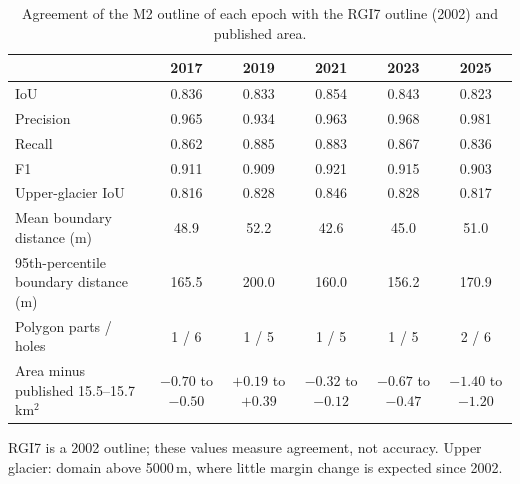 \documentclass[10pt]{article}
\newcommand{\kmsq}{km$^2$}
\begin{document}
\begin{table}[p]
\centering\footnotesize
\setlength{\tabcolsep}{5pt}
\begin{threeparttable}
\caption{Agreement of the M2 outline of each epoch with the RGI7 outline (2002) and published area.}
\label{tab:epoch_agreement}
\begin{tabular}{l ccccc}
\toprule
 & \textbf{2017} & \textbf{2019} & \textbf{2021} & \textbf{2023} & \textbf{2025} \\
\midrule
IoU                                  & 0.836 & 0.833 & 0.854 & 0.843 & 0.823 \\
Precision                            & 0.965 & 0.934 & 0.963 & 0.968 & 0.981 \\
Recall                               & 0.862 & 0.885 & 0.883 & 0.867 & 0.836 \\
F1                                   & 0.911 & 0.909 & 0.921 & 0.915 & 0.903 \\
Upper-glacier IoU                    & 0.816 & 0.828 & 0.846 & 0.828 & 0.817 \\
Mean boundary distance (m)           & 48.9 & 52.2 & 42.6 & 45.0 & 51.0 \\
95th-percentile boundary distance (m) & 165.5 & 200.0 & 160.0 & 156.2 & 170.9 \\
Polygon parts / holes                & 1 / 6 & 1 / 5 & 1 / 5 & 1 / 5 & 2 / 6 \\
Area minus published 15.5--15.7\,\kmsq & $-0.70$ to $-0.50$ & $+0.19$ to $+0.39$ & $-0.32$ to $-0.12$ & $-0.67$ to $-0.47$ & $-1.40$ to $-1.20$ \\
\bottomrule
\end{tabular}
\begin{tablenotes}\footnotesize
\item RGI7 is a 2002 outline; these values measure agreement, not accuracy. Upper glacier: domain above 5000\,m, where
little margin change is expected since 2002.
\end{tablenotes}
\end{threeparttable}
\end{table}
\end{document}
